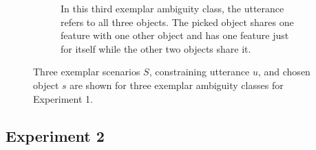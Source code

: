 \documentclass[11pt,a4paper]{article}
\begin{document}
\begin{figure}[htb]
\begin{subfigure}{\linewidth}
\begin{subfigure}[b]{0.3\linewidth}
		\end{subfigure}
		\hspace*{0.3cm}
		\begin{subfigure}[b]{0.3\linewidth}
		\end{subfigure}
		\caption{In this third exemplar ambiguity class, the utterance refers to all three objects. The picked object shares one feature with one other object and has one feature just for itself while the other two objects share it.}
	\end{subfigure}
	\caption{Three exemplar scenarios $S$, constraining utterance $u$, and chosen object $s$ are shown for three exemplar ambiguity classes for Experiment 1.}
	\label{fig:ambiguity-classes-exp1}
\end{figure}

\subsection*{Experiment 2}
\end{document}
